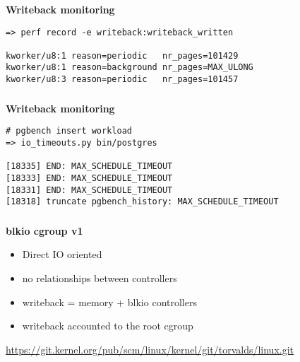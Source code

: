 \documentclass[usenames,dvipsnames, 18pt, compress, aspectratio=169]{beamer}
\begin{document}
\begin{frame}[fragile]{}
    \frametitle{}
    \begin{center}
        \textbf{Writeback monitoring}

        \begin{flushleft}
        \begin{verbatim}
=> perf record -e writeback:writeback_written

kworker/u8:1 reason=periodic   nr_pages=101429
kworker/u8:1 reason=background nr_pages=MAX_ULONG
kworker/u8:3 reason=periodic   nr_pages=101457
        \end{verbatim}
        \end{flushleft}

    \end{center}
\end{frame}

\begin{frame}[fragile]{}
    \frametitle{}
    \begin{center}
        \textbf{Writeback monitoring}

        \begin{flushleft}
        \begin{verbatim}
# pgbench insert workload
=> io_timeouts.py bin/postgres

[18335] END: MAX_SCHEDULE_TIMEOUT
[18333] END: MAX_SCHEDULE_TIMEOUT
[18331] END: MAX_SCHEDULE_TIMEOUT
[18318] truncate pgbench_history: MAX_SCHEDULE_TIMEOUT
        \end{verbatim}
        \end{flushleft}

    \end{center}
\end{frame}

\begin{frame}
    \frametitle{}
    \begin{center}
    \textbf{blkio cgroup v1}

        \begin{itemize}[label={\MVRightarrow}]
            \item Direct IO oriented
            \item no relationships between controllers
            \item writeback = memory + blkio controllers
            \item writeback accounted to the root cgroup
        \end{itemize}

        \normalsize{\href{
            https://git.kernel.org/pub/scm/linux/kernel/git/torvalds/linux.git/commit/?h=v4.14-rc4&id=3e1534cf4a2a8278e811e7c84a79da1a02347b8b
        }{\color{black}https://git.kernel.org/pub/scm/linux/kernel/git/torvalds/linux.git}}

    \end{center}
\end{frame}
\end{document}
